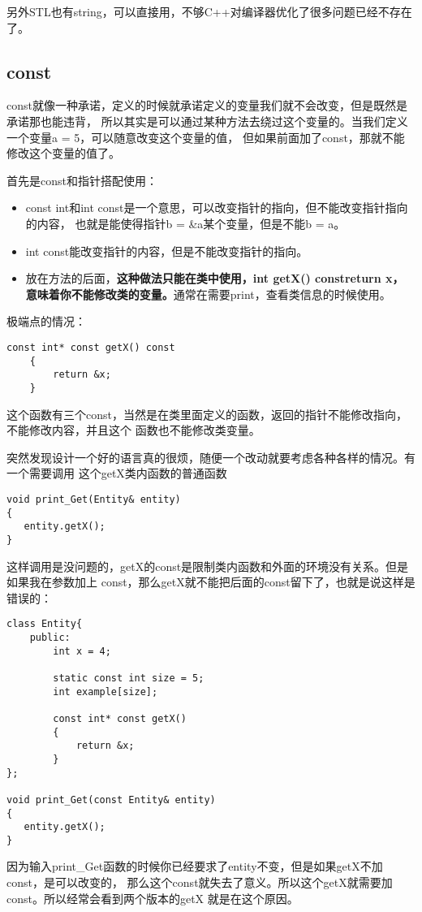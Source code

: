 \documentclass{article}
\begin{document}
\begin{sloppypar}
另外STL也有string，可以直接用，不够C++对编译器优化了很多问题已经不存在了。

\subsection{const}
const就像一种承诺，定义的时候就承诺定义的变量我们就不会改变，但是既然是承诺那也能违背，
所以其实是可以通过某种方法去绕过这个变量的。当我们定义一个变量a = 5，可以随意改变这个变量的值，
但如果前面加了const，那就不能修改这个变量的值了。

首先是const和指针搭配使用：
\begin{itemize}
	\item const int\*和int const\*是一个意思，可以改变指针的指向，但不能改变指针指向的内容，
	也就是能使得指针b = \&a某个变量，但是不能\*b = a。
	\item int\* const能改变指针的内容，但是不能改变指针的指向。
	\item 放在方法的后面，\textbf{这种做法只能在类中使用，int getX() const{return x}，
	意味着你不能修改类的变量。}通常在需要print，查看类信息的时候使用。
\end{itemize}

极端点的情况：
\begin{lstlisting}
const int* const getX() const
	{
		return &x;
	}
\end{lstlisting}
这个函数有三个const，当然是在类里面定义的函数，返回的指针不能修改指向，不能修改内容，并且这个
函数也不能修改类变量。

突然发现设计一个好的语言真的很烦，随便一个改动就要考虑各种各样的情况。有一个需要调用
这个getX类内函数的普通函数
\begin{lstlisting}
void print_Get(Entity& entity)
{
   entity.getX();
}
\end{lstlisting}
这样调用是没问题的，getX的const是限制类内函数和外面的环境没有关系。但是如果我在参数加上
const，那么getX就不能把后面的const留下了，也就是说这样是错误的：
\begin{lstlisting}
class Entity{
    public:
        int x = 4;

        static const int size = 5;
        int example[size];

        const int* const getX()
        {
            return &x;
        }
};

void print_Get(const Entity& entity)
{
   entity.getX();
}
\end{lstlisting}
因为输入print\_Get函数的时候你已经要求了entity不变，但是如果getX不加const，是可以改变的，
那么这个const就失去了意义。所以这个getX就需要加const。所以经常会看到两个版本的getX
就是在这个原因。


\end{sloppypar}
\end{document}
